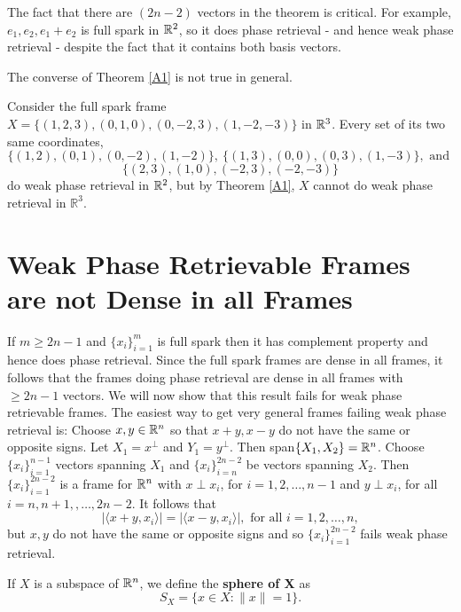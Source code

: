 \begin{remark}
The fact that there are $(2n-2)$ vectors in the theorem is critical. For example, $e_1,e_2,e_1+e_2$ is full spark
in $\mathbb R^2$, so it does phase retrieval - and hence weak phase retrieval - despite the fact that it contains both
basis vectors.
\end{remark}
The converse of Theorem \ref{A1} is not true in general.
\begin{example}
Consider the full spark frame
$X=\{(1,2,3),(0,1,0),(0,-2,3),(1,-2,-3)\}$ in $\mathbb R^3$. Every set of its two same coordinates,
\[\{(1,2),(0,1),(0,-2),(1,-2)\},\ \{(1,3),(0,0),(0,3),(1,-3)\},\mbox{ and }\]
\[\{(2,3),(1,0),(-2,3),(-2,-3)\}\]
do weak phase retrieval in $\mathbb R^2$, but by Theorem  \ref{A1}, $X$ cannot do weak phase retrieval in $\mathbb{R}^3$.
\end{example}









\section{Weak Phase Retrievable Frames are not Dense in all Frames}

If $m\ge 2n-1$ and $\{x_i\}_{i=1}^m$ is full spark then it has complement property and hence does phase retrieval.
Since the full spark frames are dense in all frames, it follows that the frames doing phase retrieval are dense in all
frames with $\ge 2n-1$ vectors.
We will now show that this result fails for weak phase retrievable frames.
The easiest way to get very general frames failing weak phase retrieval is:
\vskip10pt
Choose $x,y\in \mathbb R^n$ so that $x+y,x-y$ do not have the same or opposite signs.
Let $X_1=x^{\perp}$ and $Y_1=y^{\perp}$. Then span$\{X_1,X_2\}=\mathbb R^n$.
Choose $\{x_i\}_{i=1}^{n-1}$ vectors spanning $X_1$ and $\{x_i\}_{i=n}^{2n-2}$ be vectors spanning $X_2$. 
Then $\{x_i\}_{i=1}^{2n-2}$ is a frame for
$\mathbb R^n$ with $x\perp x_i$, for $i=1,2,\ldots,n-1$ and $y\perp x_i$, for all $i=n,n+1,,\ldots,2n-2$. It follows that
\[ |\langle x+y,x_i\rangle| = |\langle x-y,x_i\rangle|,\mbox{ for all }i=1,2,\ldots,n,\]
but $x,y$ do not have the same or opposite signs and so $\{x_i\}_{i=1}^{2n-2}$ fails weak phase retrieval.


\begin{definition}
If $X$ is a subspace of $\mathbb R^n$, we define the {\bf sphere of X} as
\[ S_X=\{x\in X:\|x\|=1\}.\]
\end{definition}


